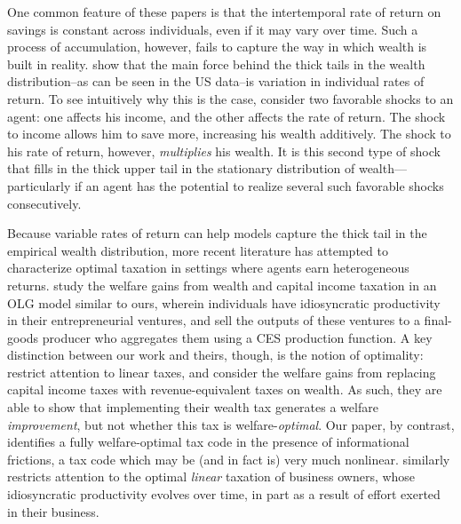 \documentclass[11pt]{article}
\begin{document}
One common feature of these papers is that the intertemporal rate of return on savings is constant across individuals, even if it may vary over time. Such a process of accumulation, however, fails to capture the way in which wealth is built in reality. \cite{benhabib2011distribution} show that the main force behind the thick tails in the wealth distribution--as can be seen in the US data--is variation in individual rates of return. To see intuitively why this is the case, consider two favorable shocks to an agent: one affects his income, and the other affects the rate of return. The shock to income allows him to save more, increasing his wealth additively. The shock to his rate of return, however, \textit{multiplies} his wealth. It is this second type of shock that fills in the thick upper tail in the stationary distribution of wealth---particularly if an agent has the potential to realize several such favorable shocks consecutively.

Because variable rates of return can help models capture the thick tail in the empirical wealth distribution, more recent literature has attempted to characterize optimal taxation in settings where agents earn heterogeneous returns. \cite{guvenen2019use} study the welfare gains from wealth and capital income taxation in an OLG model similar to ours, wherein individuals have idiosyncratic productivity in their entrepreneurial ventures, and sell the outputs of these ventures to a final-goods producer who aggregates them using a CES production function. A key distinction between our work and theirs, though, is the notion of optimality: \cite{guvenen2019use} restrict attention to linear taxes, and consider the welfare gains from replacing capital income taxes with revenue-equivalent taxes on wealth. As such, they are able to show that implementing their wealth tax generates a welfare \textit{improvement}, but not whether this tax is welfare-\textit{optimal}. Our paper, by contrast, identifies a fully welfare-optimal tax code in the presence of informational frictions, a tax code which may be (and in fact is) very much nonlinear. \cite{phelan2021optimal} similarly restricts attention to the optimal \textit{linear} taxation of business owners, whose idiosyncratic productivity evolves over time, in part as a result of effort exerted in their business. 
\end{document}
